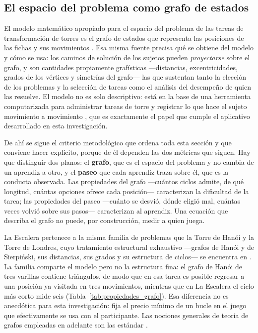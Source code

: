 \documentclass{book}
\begin{document}
\subsection*{El espacio del problema como grafo de estados}

El modelo matemático apropiado para el espacio del problema de las
tareas de transformación de torres es el grafo de estados que
representa las posiciones de las fichas y sus movimientos
\cite{Hinz2012}. Esa misma fuente precisa qué se obtiene del modelo
y cómo se usa: los caminos de solución de los sujetos pueden
\textit{proyectarse} sobre el grafo, y son cantidades propiamente
grafísticas —distancias, excentricidades, grados de los vértices y
simetrías del grafo— las que sustentan tanto la elección de los
problemas y la selección de tareas como el análisis del desempeño
de quien las resuelve. El modelo no es solo descriptivo: está en la
base de una herramienta computarizada para administrar tareas de
torre y registrar lo que hace el sujeto movimiento a movimiento
\cite{HinzKostov2009}, que es exactamente el papel que cumple el
aplicativo desarrollado en esta investigación.

De ahí se sigue el criterio metodológico que ordena toda esta
sección y que conviene hacer explícito, porque de él dependen las
dos métricas que siguen. Hay que distinguir dos planos: el
\textbf{grafo}, que es el espacio del problema y no cambia de un
aprendiz a otro, y el \textbf{paseo} que cada aprendiz traza sobre
él, que es la conducta observada. Las propiedades del grafo
—cuántos ciclos admite, de qué longitud, cuántas opciones ofrece
cada posición— caracterizan la dificultad de la tarea; las
propiedades del paseo —cuánto se desvió, dónde eligió mal, cuántas
veces volvió sobre sus pasos— caracterizan al aprendiz. Una
ecuación que describa el grafo no puede, por construcción, medir a
quien juega.

La Escalera pertenece a la misma familia de problemas que la Torre
de Hanói y la Torre de Londres, cuyo tratamiento estructural
exhaustivo —grafos de Hanói y de Sierpiński, sus distancias, sus
grados y su estructura de ciclos— se encuentra en \cite{Hinz2018}.
La familia comparte el modelo pero no la
estructura fina: el grafo de Hanói de tres varillas contiene
triángulos, de modo que en esa tarea es posible regresar a una
posición ya visitada en tres movimientos, mientras que en La
Escalera el ciclo más corto mide seis
(Tabla~\ref{tab:propiedades_grafo}). Esa diferencia no es anecdótica
para esta investigación: fija el precio mínimo de un bucle en el
juego que efectivamente se usa con el participante. Las nociones
generales de teoría de grafos empleadas en adelante son las
estándar \cite{Johnsonbaugh2005, Diestel2017}.
\end{document}
